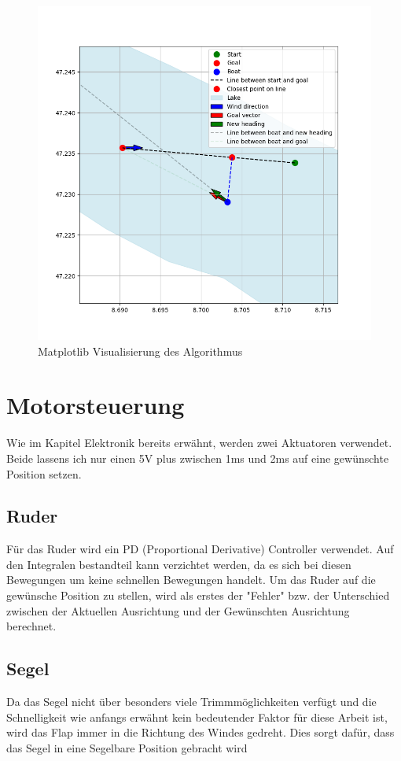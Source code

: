 \begin{figure}[H]
    \centering
    \includegraphics[width=1\linewidth]{assets/3.png}
    \caption{Matplotlib Visualisierung des Algorithmus}
    
\end{figure}

\section{Motorsteuerung}
Wie im Kapitel Elektronik bereits erwähnt, werden zwei Aktuatoren verwendet. Beide lassens ich nur einen 5V plus zwischen 1ms und 2ms auf eine gewünschte Position setzen. 

\subsection{Ruder}
Für das Ruder wird ein PD (Proportional Derivative) Controller verwendet. Auf den Integralen bestandteil kann verzichtet werden, da es sich bei diesen Bewegungen um keine schnellen Bewegungen handelt. 
Um das Ruder auf die gewünsche Position zu stellen, wird als erstes der "Fehler" bzw. der Unterschied zwischen der Aktuellen Ausrichtung und der Gewünschten Ausrichtung berechnet. 

\subsection{Segel}
Da das Segel nicht über besonders viele Trimmmöglichkeiten verfügt und die Schnelligkeit wie anfangs erwähnt kein bedeutender Faktor für diese Arbeit ist, wird das Flap immer in die Richtung des Windes gedreht. Dies sorgt dafür, dass das Segel in eine Segelbare Position gebracht wird 


 








